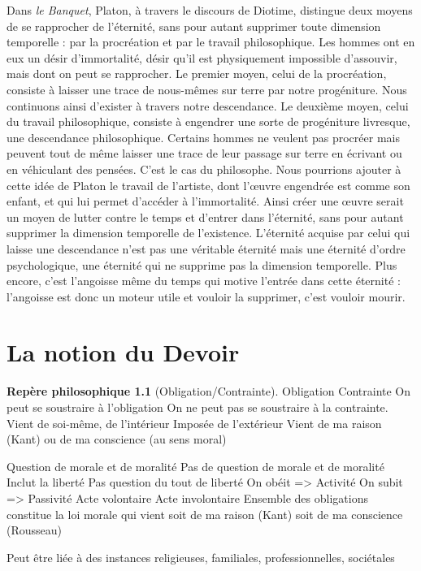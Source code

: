 \documentclass[french]{book}
\theoremstyle{definition}
\newtheorem*{rep}{Repère philosophique}
\begin{document}
Dans \textit{le Banquet}, Platon, à travers le discours de Diotime, distingue deux moyens de se rapprocher de l’éternité, sans pour autant supprimer toute dimension temporelle : par la procréation et par le travail philosophique. Les hommes ont en eux un désir d’immortalité, désir qu’il est physiquement impossible d’assouvir, mais dont on peut se rapprocher.
Le premier moyen, celui de la procréation, consiste à laisser une trace de nous-mêmes sur terre par notre progéniture. Nous continuons ainsi d’exister à travers notre descendance. Le deuxième moyen, celui du travail philosophique, consiste à engendrer une sorte de progéniture livresque, une descendance philosophique. Certains hommes ne veulent pas procréer mais peuvent tout de même laisser une trace de leur passage sur terre en écrivant ou en véhiculant des pensées. C’est le cas du philosophe.
Nous pourrions ajouter à cette idée de Platon le travail de l’artiste, dont l’œuvre engendrée est comme son enfant, et qui lui permet d’accéder à l’immortalité. Ainsi créer une œuvre serait un moyen de lutter contre le temps et d’entrer dans l’éternité, sans pour autant supprimer la dimension temporelle de l’existence. L’éternité acquise par celui qui laisse une descendance n’est pas une véritable éternité mais une éternité d’ordre psychologique, une éternité qui ne supprime pas la dimension temporelle. Plus encore, c’est l’angoisse même du temps qui motive l’entrée dans cette éternité : l’angoisse est donc un moteur utile et vouloir la supprimer, c’est vouloir mourir.

\chapter{La notion du Devoir}

\begin{rep}[Obligation/Contrainte]
Obligation
Contrainte
On peut se soustraire à l’obligation
On ne peut pas se soustraire à la contrainte.
Vient de soi-même, de l’intérieur
Imposée de l’extérieur
Vient de ma raison (Kant) ou de ma conscience (au sens moral)
\end{rep}


Question de morale et de moralité
Pas de question de morale et de moralité
Inclut la liberté
Pas question du tout de liberté
On obéit => Activité
On subit => Passivité
Acte volontaire
Acte involontaire
Ensemble des obligations constitue la loi morale qui vient soit de ma raison (Kant) soit de ma conscience (Rousseau)


Peut être liée à des instances religieuses, familiales, professionnelles, sociétales
\end{document}

